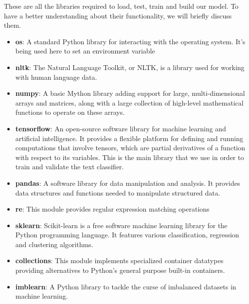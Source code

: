 These are all the libraries required to load, test, train and build our model. To have a better understanding about their functionality, we will briefly discuss them.
\begin{itemize}
	\item \textbf{os}: A standard Python library for interacting with the operating system. It's being used here to set an environment variable
	
	\item \textbf{nltk}: The Natural Language Toolkit, or NLTK, is a library used for working with human language data.
	
	\item \textbf{numpy}: A basic Mython library adding support for large, multi-dimensional arrays and matrices, along with a large collection of high-level mathematical functions to operate on these arrays.
	
	\item \textbf{tensorflow}: An open-source software library for machine learning and artificial intelligence. It provides a flexible platform for defining and running computations that involve tensors, which are partial derivatives of a function with respect to its variables. This is the main library that we use in order to train and validate the text classifier.
	
	\item \textbf{pandas}: A software library for data manipulation and analysis. It provides data structures and functions needed to manipulate structured data.
	
	\item \textbf{re}: This module provides regular expression matching operations
	
	\item \textbf{sklearn}: Scikit-learn is a free software machine learning library for the Python programming language. It features various classification, regression and clustering algorithms.
	
	\item \textbf{collections}: This module implements specialized container datatypes providing alternatives to Python’s general purpose built-in containers.
	
	\item \textbf{imblearn}: A Python library to tackle the curse of imbalanced datasets in machine learning.
\end{itemize}


